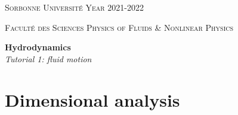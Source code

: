 \documentclass[11pt,a4paper]{article}
\begin{document}
\setlength{\unitlength}{1cm}
\noindent
\parbox{\textwidth}{
\textsc{
Sorbonne Université  
\hfill
Year 2021-2022
}
}
\parbox{\textwidth}{
\textsc{
Faculté des Sciences
\hfill
Physics of Fluids \& Nonlinear Physics
}
}

\begin{center}
\Large
\textbf{Hydrodynamics} \\ 
\textsl{Tutorial 1: fluid motion} \\[1ex]
\end{center}

\section{Dimensional analysis}
\toggletrue{corrige}
\end{document}
